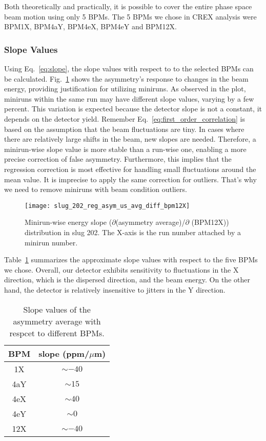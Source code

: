 Both theoretically and practically, it is possible to cover the entire phase space
beam motion using only 5 BPMs.
The 5 BPMs we chose in CREX analysis were BPM1X, BPM4aY, BPM4eX, BPM4eY and BPM12X.

\subsubsection{Slope Values}
Using Eq.~\ref{eq:slope}, the slope values with respect to to the selected BPMs can be calculated. 
Fig.~\ref{fig:slug_202_reg_asym_us_avg_diff_bpm12X} shows the asymmetry's response
to changes in the beam energy, providing justification for utilizing miniruns. 
As observed in the plot, miniruns within the same run may have different 
slope values, varying by a few percent. This variation is expected because the 
detector slope is not a constant, it depends on the detector yield. 
Remember Eq.~\ref{eq:first_order_correlation} is based on the assumption that 
the beam fluctuations are tiny. In cases where there are relatively large shifts in the 
beam, new slopes are needed. Therefore, a minirun-wise slope value is 
more stable than a run-wise one, enabling a more precise correction of false 
asymmetry. Furthermore, this implies that the regression correction is most effective
for handling small fluctuations around the mean value. It is imprecise to apply
the same correction for outliers. That's why we need to remove miniruns with beam condition outliers.
\begin{figure}[!h]
    \centering
    \texttt{[image: slug\_202\_reg\_asym\_us\_avg\_diff\_bpm12X]}
    \caption{Minirun-wise energy slope ($\partial$(asymmetry average)/$\partial$ (BPM12X)) 
    distribution in slug 202. The X-axis is the run number attached by a minirun number.}
    \label{fig:slug_202_reg_asym_us_avg_diff_bpm12X}
\end{figure}

Table~\ref{tab:crex_slope} summarizes the approximate slope values with respect to the 
five BPMs we chose. Overall, our detector exhibits sensitivity to fluctuations in the X direction, 
which is the dispersed direction, and the beam energy. On the other hand, the detector
is relatively insensitive to jitters in the Y direction.
\begin{table}[!h]
    \centering
    \begin{tabular}{c | c}
	\hline
	BPM & slope (ppm/$\mu$m)   \\
	\hline
	1X  & $\sim -40$    \\
	4aY & $\sim 15$    \\
	4eX & $\sim 40$	\\
	4eY & $\sim 0$	\\
	12X & $\sim -40$    \\
	\hline
    \end{tabular}
    \caption{Slope values of the asymmetry average with respcet to different BPMs.}
    \label{tab:crex_slope}
\end{table}

